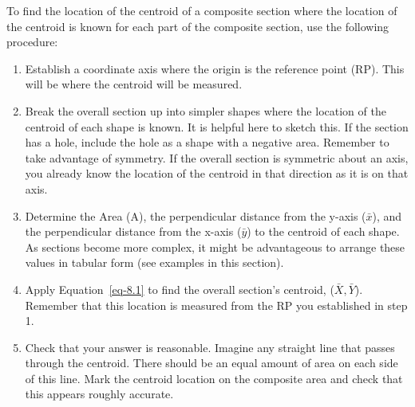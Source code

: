\documentclass[
  letterpaper,
  DIV=11,
  numbers=noendperiod]{scrreprt}
\providecommand{\tightlist}{%
  \setlength{\itemsep}{0pt}\setlength{\parskip}{0pt}}\usepackage{longtable,booktabs,array}
\theoremstyle{definition}
\theoremstyle{remark}
\begin{document}
\begin{tcolorbox}
\begin{tcolorbox}
\end{tcolorbox}

\end{tcolorbox}

\begin{tcolorbox}[enhanced jigsaw, leftrule=.75mm, colbacktitle=quarto-callout-warning-color!10!white, breakable, opacityback=0, colback=white, titlerule=0mm, toprule=.15mm, colframe=quarto-callout-warning-color-frame, coltitle=black, title={Step-by-step: Finding the Centroid of Composite Sections}, toptitle=1mm, bottomrule=.15mm, rightrule=.15mm, left=2mm, arc=.35mm, opacitybacktitle=0.6, bottomtitle=1mm]

To find the location of the centroid of a composite section where the
location of the centroid is known for each part of the composite
section, use the following procedure:

\begin{enumerate}
\def\labelenumi{\arabic{enumi}.}
\tightlist
\item
  Establish a coordinate axis where the origin is the reference point
  (RP). This will be where the centroid will be measured.
\item
  Break the overall section up into simpler shapes where the location of
  the centroid of each shape is known. It is helpful here to sketch
  this. If the section has a hole, include the hole as a shape with a
  negative area. Remember to take advantage of symmetry. If the overall
  section is symmetric about an axis, you already know the location of
  the centroid in that direction as it is on that axis.
\item
  Determine the Area (A), the perpendicular distance from the y-axis
  (\(\bar{x}\)), and the perpendicular distance from the x-axis
  (\(\bar{y}\)) to the centroid of each shape. As sections become more
  complex, it might be advantageous to arrange these values in tabular
  form (see examples in this section).
\item
  Apply Equation~\ref{eq-8.1} to find the overall section's centroid,
  (\(\bar{X}, \bar{Y}\)). Remember that this location is measured from
  the RP you established in step 1.
\item
  Check that your answer is reasonable. Imagine any straight line that
  passes through the centroid. There should be an equal amount of area
  on each side of this line. Mark the centroid location on the composite
  area and check that this appears roughly accurate.
\end{enumerate}

\end{tcolorbox}
\end{document}
